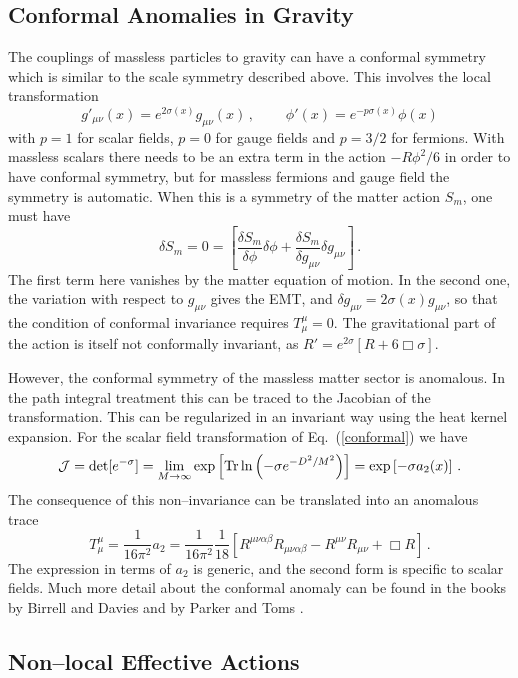\documentclass[11pt,a4paper]{article}
\newcommand{\be}{\begin{equation}}
\newcommand{\ee}{\end{equation}}
\newcommand{\Tr}{{\rm Tr}}
\begin{document}
\subsection{Conformal Anomalies in Gravity}

The couplings of massless particles to gravity can have a conformal symmetry which is similar to the scale symmetry described above. This involves the local transformation
\be
g'_{\mu\nu} (x) = e^{2\sigma (x)}g_{\mu\nu} (x) \,,       ~~~~~~~~~~\phi' (x) = e^{-p\sigma(x)} \phi (x)
\label{conformal}
\ee
with $p=1$ for scalar fields, $p=0$ for gauge fields and $p=3/2$ for fermions. With massless scalars there needs to be an extra term in the action $-R\phi^2/6$ in order to have conformal symmetry, but for massless fermions and gauge field the symmetry is automatic. When this is a symmetry of the matter action $S_m$, one must have
\be
\delta S_m = 0 = \left[\frac{\delta S_m}{\delta \phi}\delta \phi +\frac{\delta S_m}{\delta g_{\mu\nu}}\delta g_{\mu\nu} \right]   \,.
\ee
The first term here vanishes by the matter equation of motion. In the second one, the variation with respect to $g_{\mu\nu}$ gives the EMT, and $\delta g_{\mu\nu} = 2\sigma(x)  g_{\mu\nu}$, so that the condition of conformal invariance requires $T^\mu_\mu =0$. The gravitational part of the action is itself not conformally invariant, as $R'=e^{2\sigma } [R +6\Box \sigma]$.

However, the conformal symmetry of the massless matter sector is anomalous. In the path integral treatment this can be traced to the Jacobian of the transformation. This can be regularized in an invariant way using the heat kernel expansion. For the scalar field transformation of Eq.~(\ref{conformal}) we have
\be
{\cal J}= \det[e^{-\sigma}] = \lim_{M\to \infty} \exp\left[\Tr \,\text{ln} \left(-\sigma e^{-D^2/M^2}\right)\right]= \exp \left[-\sigma a_2(x)\right] \,.
\ee
The consequence of this non--invariance can be translated into an anomalous trace
\be
T^\mu_\mu = \frac{1}{16\pi^2}a_2 = \frac{1}{16\pi^2}\frac{1}{18}\left[R^{\mu\nu\alpha\beta}  R_{\mu\nu\alpha\beta}  - R^{\mu\nu}  R_{\mu\nu} +\Box R \right] \,.
\ee
The expression in terms of $a_2$ is generic, and the second form is specific to scalar fields. Much more detail about the conformal anomaly can be found in the books by Birrell and Davies \cite{Birrell:1982ix} and by Parker and Toms \cite{Parker:2009uva}.


\subsection{Non--local Effective Actions}
\end{document}
